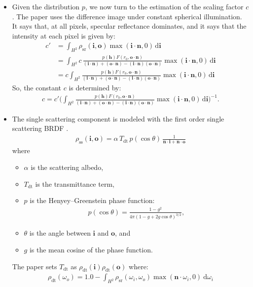 \documentclass[10pt]{article}
\newcommand{\dee}{\mathrm{d}}
\newcommand{\ve}[1]{\mathbf{#1}}
\begin{document}
\begin{itemize}
  		\item Given the distribution $p$, we now turn to the estimation of the scaling factor $c$.  The paper uses the difference image under constant spherical illumination.  It says that, at all pixels, specular reflectance dominates, and it says that the intensity at each pixel is given by:
  		\begin{align*}
  			c' 
  			&= \int_{H^2} \rho_{\mathrm{sr}}(\ve{i},\ve{o}) \max(\ve{i} \cdot \ve{n},0)\, \dee\ve{i} \\
  			&= \int_{H^2} c\, \frac{p(\ve{h}) F(r_0, \ve{o}\cdot \ve{n})}{(\ve{i}\cdot\ve{n}) + (\ve{o}\cdot\ve{n}) - (\ve{i}\cdot\ve{n})(\ve{o}\cdot\ve{n})} \max(\ve{i} \cdot \ve{n},0)\, \dee\ve{i} \\
  			&= c \int_{H^2} \frac{p(\ve{h}) F(r_0, \ve{o}\cdot \ve{n})}{(\ve{i}\cdot\ve{n}) + (\ve{o}\cdot\ve{n}) - (\ve{i}\cdot\ve{n})(\ve{o}\cdot\ve{n})} \max(\ve{i} \cdot \ve{n},0)\, \dee\ve{i}
  		\end{align*}
  		So, the constant $c$ is determined by:
  		\begin{align*}
  		c = c' \bigg( \int_{H^2} \frac{p(\ve{h}) F(r_0, \ve{o}\cdot \ve{n})}{(\ve{i}\cdot\ve{n}) + (\ve{o}\cdot\ve{n}) - (\ve{i}\cdot\ve{n})(\ve{o}\cdot\ve{n})} \max(\ve{i} \cdot \ve{n},0)\, \dee\ve{i} \bigg)^{-1}.
  		\end{align*}

  		\item The single scattering component is modeled with the first order single scattering BRDF \cite{Hanrahan:1993}.
  		\begin{align*}
  			\rho_{\mathrm{ss}}(\ve{i},\ve{o}) = \alpha \, T_{\mathrm{dt}} \, p(\cos\theta)\, \frac{1}{\ve{n} \cdot \ve{i} + \ve{n} \cdot \ve{o}}
  		\end{align*}
  		where
  		\begin{itemize}
  			\item $\alpha$ is the scattering albedo,
  			\item $T_{\mathrm{dt}}$ is the transmittance term,
  			\item $p$ is the Henyey--Greenstein phase function:
  			\begin{align*}
  				p(\cos \theta) = \frac{1-g^2}{4\pi(1-g+2g\cos\theta)^{3/2}},
  			\end{align*}
  			\item $\theta$ is the angle between $\ve{i}$ and $\ve{o}$, and
  			\item $g$ is the mean cosine of the phase function.
  		\end{itemize}
  		The paper sets $T_{\mathrm{dt}}$ as $\rho_{\mathrm{dt}}(\ve{i}) \rho_{\mathrm{dt}}(\ve{o})$ where:
  		\begin{align*}
  			\rho_{\mathrm{dt}}(\omega_o) = 1.0 - \int_{H^2} \rho_{\mathrm{sr}}(\omega_i, \omega_o) \max(\ve{n} \cdot \omega_i,0)\ \dee\omega_i
  		\end{align*}


\end{itemize}
\end{document}
